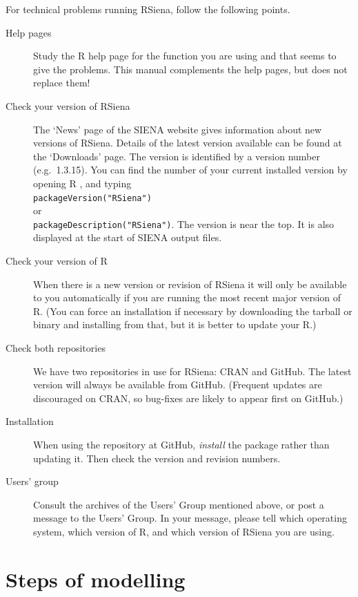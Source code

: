 \documentclass[a4paper,fleqn,11pt]{article}
\newcommand{\+}{\, + \,}
\newcommand{\R}{{\sf R }}
\newcommand{\Rn}{{\sf R}}
\newcommand{\rs}{{\sf RSiena}}
\newcommand{\RS}{{\sf RSiena }}
\newcommand{\SI}{{\sf SIENA }}
\begin{document}
For technical problems running \rs, follow the following points.
\begin{description}
\item[Help pages] Study the \R help page for the function you are using and that seems to give
      the problems. This manual complements the help pages,
      but does not replace them!
\item[Check your version of \RS]
  The `News' page of the \SI website gives information about new versions
  of \rs. Details of the latest version available can
  be found at the `Downloads' page.
  The version is
  identified by a version number (e.g.\ 1.3.15).
  You can find the number of your current installed version by
  opening \R, and typing\\
  \verb|packageVersion("RSiena")|   \\
  or \\
  \verb|packageDescription("RSiena")|. The version is
  near the top. It is also displayed at the
  start of \SI output files.
\item[Check your version of \Rn] When there is a new version or revision of \RS
  it will only be available to you automatically if you are running the most
  recent major version of \Rn. (You can force an installation if
  necessary by downloading the tarball or binary and installing from that, but
  it is better to update your \Rn.)
\item [Check both repositories] We have two repositories in use for \rs: CRAN
  and GitHub. The latest version will always be available from
  GitHub. (Frequent updates are discouraged on CRAN, so bug-fixes are likely to
  appear first on GitHub.)
\item[Installation] When using the repository at GitHub, \emph{install} the
  package rather than updating it. Then check the version and revision numbers.
\item[Users' group] Consult the archives of the Users' Group mentioned above, or post
     a message to the Users' Group. In your message,
     please tell which operating system, which version of \Rn, and which version
     of \RS you are using.
\end{description}

\newpage

\section{Steps of modelling}
\label{S_parts}
\end{document}
